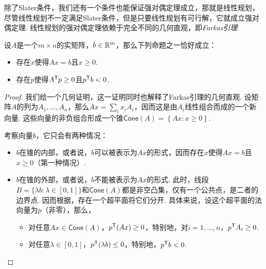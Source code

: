 除了Slater条件，我们还有一个条件也能保证强对偶定理成立，那就是线性规划，尽管线性规划不一定满足Slater条件，但是只要线性规划有可行解，它就成立强对偶定理. 线性规划的强对偶定理依赖于完全不同的几何直观，即\textit{Farkas引理}. 

\begin{theorem}[Farkas引理]\label{theorem:farkas}
    设$A$是一个$m\times n$的实矩阵，$b\in\mathbb{R}^m$，那么下列命题之一恰好成立：
    \begin{itemize}
        \item 存在$x$使得$Ax=b$且$x\geq 0$.
        \item 存在$p$使得$A^{\mathsf{T}} p\geq 0$且$p^{\mathsf{T}} b<0$.
    \end{itemize}
\end{theorem}

\begin{proof}
我们给一个几何证明，这一证明同时也解释了Farkas引理的几何直观. 设矩阵$A$的列为$A_1,\dots,A_n$，那么$Ax=\sum_i x_iA_i$，因而这是由$A_i$线性组合而成的一个新向量. 这些向量的非负组合形成一个锥$\mathsf{Cone}(A) = \left\{Ax: x\geq 0\right\}$.

考察向量$b$，它只会有两种情况：
\begin{itemize}
    \item $b$在锥的内部，或者说，$b$可以被表示为$Ax$的形式，因而存在$x$使得$Ax=b$且$x\geq 0$（第一种情况）.
    \item $b$在锥的外部，或者说，$b$不能被表示为$Ax$的形式. 此时，线段$B=\{\lambda b:\lambda\in[0,1]\}$和$\mathsf{Cone}(A)$都是非空凸集，仅有一个公共点，是二者的边界点. 因而根据，存在一个超平面将它们分开. 具体来说，设这个超平面的法向量为$p$（非零），那么，
    \begin{itemize}
        \item 对任意$Ax\in\mathsf{Cone}(A)$，$p^{\mathsf{T}} (Ax)\geq 0$，特别地，对$i=1,\dots,n$，$p^{\mathsf{T}} A_i\geq 0$.
        \item 对任意$\lambda\in[0,1]$，$p^{\mathsf{T}} (\lambda b)\leq 0$，特别地，$p^{\mathsf{T}} b<0$.
    \end{itemize}
\end{itemize}
\end{proof}

